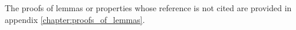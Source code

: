 

The proofs of lemmas or properties whose reference is not cited are provided
in appendix \ref{chapter:proofs_of_lemmas}.
